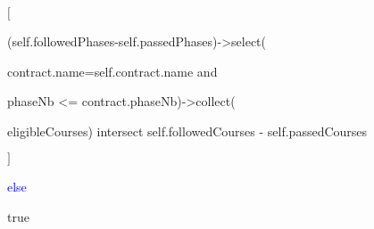 \begin{enumerate}
	 \par \hspace*{25 mm} $[$
	 \par \hspace*{27 mm} (self.followedPhases-self.passedPhases)->select(
	 \par \hspace*{27 mm} contract.name=self.contract.name and 
	 \par \hspace*{27 mm} phaseNb <= contract.phaseNb)->collect(
	 \par \hspace*{27 mm}  eligibleCourses) intersect self.followedCourses -
	 self.passedCourses \par \hspace*{25 mm} $]$
	 \par \hspace*{20 mm} \textcolor{Blue}{else}
	 \par \hspace*{25 mm} true
	 

\end{enumerate}
